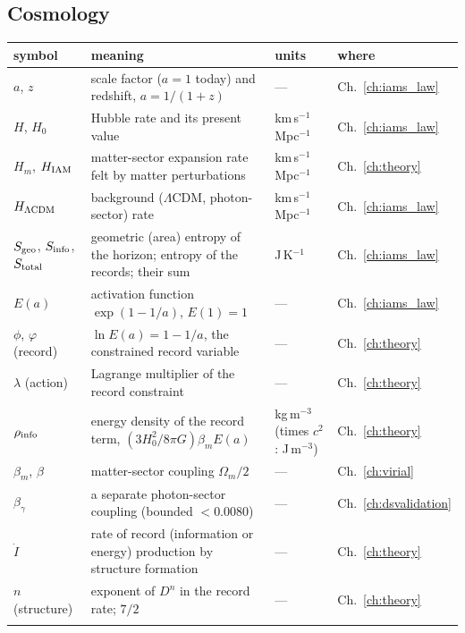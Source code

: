 \subsection*{Cosmology}
{\small\begin{longtable}{@{}>{\raggedright\arraybackslash}p{}>{\raggedright\arraybackslash}p{}>{\raggedright\arraybackslash}p{}>{\raggedright\arraybackslash}p{}@{}}
\toprule symbol & meaning & units & where\\\midrule\endhead
$a$, $z$ & scale factor ($a=1$ today) and redshift, $a=1/(1+z)$ & --- & Ch.~\ref{ch:iams_law}\\\iamrowrule
$H$, $H_0$ & Hubble rate and its present value & km\,s$^{-1}$\,Mpc$^{-1}$ & Ch.~\ref{ch:iams_law}\\\iamrowrule
$H_m$, $H_{\rm IAM}$ & matter-sector expansion rate felt by matter perturbations & km\,s$^{-1}$\,Mpc$^{-1}$ & Ch.~\ref{ch:theory}\\\iamrowrule
$H_{\Lambda\rm CDM}$ & background ($\Lambda$CDM, photon-sector) rate & km\,s$^{-1}$\,Mpc$^{-1}$ & Ch.~\ref{ch:iams_law}\\\iamrowrule
$S_{\rm geo}$, $S_{\rm info}$, $S_{\rm total}$ & geometric (area) entropy of the horizon; entropy of the records; their sum & J\,K$^{-1}$ & Ch.~\ref{ch:iams_law}\\\iamrowrule
$E(a)$ & activation function $\exp(1-1/a)$, $E(1)=1$ & --- & Ch.~\ref{ch:iams_law}\\\iamrowrule
$\phi$, $\varphi$ (record) & $\ln E(a)=1-1/a$, the constrained record variable & --- & Ch.~\ref{ch:theory}\\\iamrowrule
$\lambda$ (action) & Lagrange multiplier of the record constraint & --- & Ch.~\ref{ch:theory}\\\iamrowrule
$\rho_{\rm info}$ & energy density of the record term, $(3H_0^2/8\pi G)\beta_mE(a)$ & kg\,m$^{-3}$ (times $c^2$: J\,m$^{-3}$) & Ch.~\ref{ch:theory}\\\iamrowrule
$\beta_m$, $\beta$ & matter-sector coupling $\Omega_m/2$ & --- & Ch.~\ref{ch:virial}\\\iamrowrule
$\beta_\gamma$ & a separate photon-sector coupling (bounded $<0.0080$) & --- & Ch.~\ref{ch:dsvalidation}\\\iamrowrule
$\dot I$ & rate of record (information or energy) production by structure formation & --- & Ch.~\ref{ch:theory}\\\iamrowrule
$n$ (structure) & exponent of $D^n$ in the record rate; $7/2$ & --- & Ch.~\ref{ch:theory}\\\iamrowrule

\end{longtable}}
